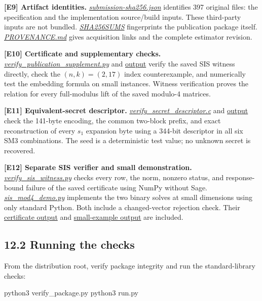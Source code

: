 \documentclass[
  american,
  10pt,
  a4paper,
]{article}
\newenvironment{Shaded}{}{}
\newcommand{\ExtensionTok}[1]{#1}
\newcommand{\NormalTok}[1]{#1}
\begin{document}
\textbf{{[}E9{]} Artifact identities.}
\href{data/submission-sha256.json}{\emph{submission-sha256.json}}
identifies 397 original files: the specification and the implementation
source/build inputs. These third-party inputs are not bundled.
\href{SHA256SUMS}{\emph{SHA256SUMS}} fingerprints the publication
package itself. \href{PROVENANCE.md}{\emph{PROVENANCE.md}} gives
acquisition links and the complete estimator revision.

\textbf{{[}E10{]} Certificate and supplementary checks.}
\href{code/verify_publication_supplement.py}{\emph{verify\_publication\_supplement.py}}
and \href{evidence/verify_publication_supplement.json}{output} verify
the saved SIS witness directly, check the \((n,k)=(2,17)\) index
counterexample, and numerically test the embedding formula on small
instances. Witness verification proves the relation for every
full-modulus lift of the saved modulo-4 matrices.

\textbf{{[}E11{]} Equivalent-secret descriptor.}
\href{code/verify_secret_descriptor.c}{\emph{verify\_secret\_descriptor.c}}
and \href{evidence/original_code.json}{output} check the 141-byte
encoding, the common two-block prefix, and exact reconstruction of every
\(s_1\) expansion byte using a 344-bit descriptor in all six SM3
combinations. The seed is a deterministic test value; no unknown secret
is recovered.

\textbf{{[}E12{]} Separate SIS verifier and small demonstration.}
\href{code/verify_sis_witness.py}{\emph{verify\_sis\_witness.py}} checks
every row, the norm, nonzero status, and response-bound failure of the
saved certificate using NumPy without Sage.
\href{code/sis_mod4_demo.py}{\emph{sis\_mod4\_demo.py}} implements the
two binary solves at small dimensions using only standard Python. Both
include a changed-vector rejection check. Their
\href{evidence/verify_sis_witness.json}{certificate output} and
\href{evidence/sis_mod4_demo.json}{small-example output} are included.

\subsection{12.2 Running the checks}\label{running-the-checks}

From the distribution root, verify package integrity and run the
standard-library checks:

\begin{Shaded}
\begin{Highlighting}[]
\ExtensionTok{python3}\NormalTok{ verify\_package.py}
\ExtensionTok{python3}\NormalTok{ run.py}
\end{Highlighting}
\end{Shaded}
\end{document}

